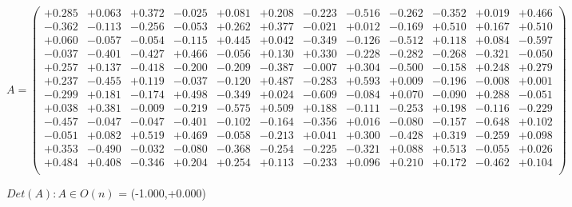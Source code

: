 \documentclass[9pt]{article}
\theoremstyle{plain}
\theoremstyle{definition}
\theoremstyle{remark}
\numberwithin{equation}{section}
\begin{document}
$A = \left(
\begin{array}{
cccccccccccc}
+0.285 & +0.063 & +0.372 & -0.025 & +0.081 & +0.208 & -0.223 & -0.516 & -0.262 & -0.352 & +0.019 & +0.466 \\
-0.362 & -0.113 & -0.256 & -0.053 & +0.262 & +0.377 & -0.021 & +0.012 & -0.169 & +0.510 & +0.167 & +0.510 \\
+0.060 & -0.057 & -0.054 & -0.115 & +0.445 & +0.042 & -0.349 & -0.126 & -0.512 & +0.118 & +0.084 & -0.597 \\
-0.037 & -0.401 & -0.427 & +0.466 & -0.056 & +0.130 & +0.330 & -0.228 & -0.282 & -0.268 & -0.321 & -0.050 \\
+0.257 & +0.137 & -0.418 & -0.200 & -0.209 & -0.387 & -0.007 & +0.304 & -0.500 & -0.158 & +0.248 & +0.279 \\
+0.237 & -0.455 & +0.119 & -0.037 & -0.120 & +0.487 & -0.283 & +0.593 & +0.009 & -0.196 & -0.008 & +0.001 \\
-0.299 & +0.181 & -0.174 & +0.498 & -0.349 & +0.024 & -0.609 & -0.084 & +0.070 & -0.090 & +0.288 & -0.051 \\
+0.038 & +0.381 & -0.009 & -0.219 & -0.575 & +0.509 & +0.188 & -0.111 & -0.253 & +0.198 & -0.116 & -0.229 \\
-0.457 & -0.047 & -0.047 & -0.401 & -0.102 & -0.164 & -0.356 & +0.016 & -0.080 & -0.157 & -0.648 & +0.102 \\
-0.051 & +0.082 & +0.519 & +0.469 & -0.058 & -0.213 & +0.041 & +0.300 & -0.428 & +0.319 & -0.259 & +0.098 \\
+0.353 & -0.490 & -0.032 & -0.080 & -0.368 & -0.254 & -0.225 & -0.321 & +0.088 & +0.513 & -0.055 & +0.026 \\
+0.484 & +0.408 & -0.346 & +0.204 & +0.254 & +0.113 & -0.233 & +0.096 & +0.210 & +0.172 & -0.462 & +0.104 \\
\end{array}
\right)$ \newline 

$Det(A) :   A \in O(n)$ = (-1.000,+0.000)
\end{document}

